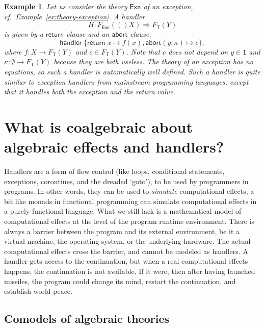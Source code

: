 \documentclass{amsart}
\newcommand{\theory}[1]{\mathsf{#1}} %
\newcommand{\Free}[2]{F_{\theory{#1}}(#2)} %
\newcommand{\one}{\mathsf{1}} %
\newcommand{\hto}{\Rightarrow} %
\newcommand{\kode}[1]{\mathsf{#1}}
\newcommand{\handler}{\kode{handler}\;}
\newcommand{\opclause}[3]{#1(#2; #3) \mapsto}
\newcommand{\return}[1]{\kode{return}\;#1}
\newcommand{\retclause}[1]{\return{#1} \mapsto}
\newtheorem{example}[definition]{Example}
\begin{document}
\begin{example}
  Let us consider the theory $\theory{Exn}$ of an exception, cf.\
  Example~\ref{ex:theory-exception}. A handler
  \begin{equation*}
    H : \Free{Exn}(X) \hto \Free{T}{Y}
  \end{equation*}
  is given by a $\kode{return}$ clause and an $\kode{abort}$ clause,
  \begin{equation*}
    \handler \{
      \retclause{x} f(x),
      \opclause{\kode{abort}}{y}{\kappa} c
    \},
  \end{equation*}
  where $f : X \to \Free{T}{Y}$ and $c \in \Free{T}{Y}$. Note that $c$ does not
  depend on $y \in \one$ and $\kappa : \emptyset \to \Free{T}{Y}$ because they
  are both useless. The theory of an exception has no equations, so such a
  handler is automatically well defined. Such a handler is quite similar to
  exception handlers from mainstream programming languages, except that it
  handles both the exception and the return value.
\end{example}

\section{What is coalgebraic about algebraic effects and handlers?}
\label{sec:what-coalg-about}

Handlers are a form of flow control (like loops, conditional statements,
exceptions, coroutines, and the dreaded `goto'), to be used by programmers in
programs. In other words, they can be used to \emph{simulate} computational
effects, a bit like monads in functional programming can simulate
computational effects in a purely functional language. What we still lack is a
mathematical model of computational effects at the level of the program runtime
environment. There is always a barrier between the program and its external
environment, be it a virtual machine, the operating system, or the underlying
hardware. The actual computational effects cross the barrier, and cannot be
modeled as handlers. A handler gets access to the continuation, but when a real
computational effects happens, the continuation is not available. If it were,
then after having launched missiles, the program could change its mind, restart
the continuation, and establish world peace.

\subsection{Comodels of algebraic theories}
\label{sec:comod-algebr-theor}
\end{document}

